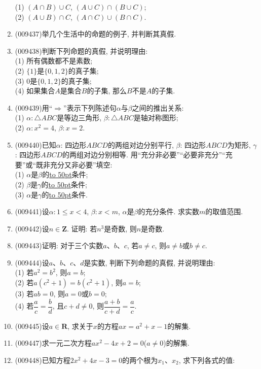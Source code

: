 \documentclass[10pt,a4paper]{article}
\newcommand{\blank}[1]{\underline{\hbox to #1pt{}}}
\begin{document}
\begin{enumerate}[1.]
(1) $(A\cap B)\cup C$, $(A\cup C)\cap (B\cup C)$;\\
(2) $(A\cup B)\cap C$, $(A\cap C)\cup (B\cap C)$.
\item {\tiny (009437)}举几个生活中的命题的例子, 并判断其真假.
\item {\tiny (009438)}判断下列命题的真假, 并说明理由:\\
(1) 所有偶数都不是素数;\\
(2) $\{1\}$是$\{0, 1, 2\}$的真子集;\\
(3) $0$是$\{0, 1, 2\}$的真子集;\\
(4) 如果集合$A$是集合$B$的子集, 那么$B$不是$A$的子集.
\item {\tiny (009439)}用``$\Rightarrow$''表示下列陈述句$\alpha$与$\beta$之间的推出关系:\\
(1) $\alpha: \triangle ABC$是等边三角形, $\beta: \triangle ABC$是轴对称图形;\\
(2) $\alpha: x^2=4$, $\beta: x=2$.
\item {\tiny (009440)}已知$\alpha$: 四边形$ABCD$的两组对边分别平行, $\beta$: 四边形$ABCD$为矩形, $\gamma$: 四边形$ABCD$的两组对边分别相等. 用``充分非必要''``必要非充分''``充要''或``既非充分又非必要''填空:\\
(1) $\alpha$是$\beta$的\blank{50}条件;\\
(2) $\beta$是$\gamma$的\blank{50}条件;\\
(3) $\alpha$是$\gamma$的\blank{50}条件.
\item {\tiny (009441)}设$\alpha: 1\le x<4$, $\beta: x<m$, $\alpha$是$\beta$的充分条件. 求实数$m$的取值范围.
\item {\tiny (009442)}设$n\in \mathbf{Z}$. 证明: 若$n^3$是奇数, 则$n$是奇数.
\item {\tiny (009443)}证明: 对于三个实数$a$、$b$、$c$, 若$a\ne c$, 则$a\ne b$或$b\ne c$.
\item {\tiny (009444)}设$a$、$b$、$c$、$d$是实数, 判断下列命题的真假, 并说明理由:\\
(1) 若$a^2=b^2$, 则$a=b$;\\
(2) 若$a(c^2+1)=b(c^2+1)$, 则$a=b$;\\
(3) 若$ab=0$, 则$a=0$或$b=0$;\\
(4) 若$\dfrac ac=\dfrac bd$, 且$c+d\ne 0$, 则$\dfrac{a+b}{c+d}=\dfrac ac$.
\item {\tiny (009445)}设$a\in \mathbf{R}$, 求关于$x$的方程$ax=a^2+x-1$的解集.
\item {\tiny (009447)}求一元二次方程$ax^2-4x+2=0$($a\ne 0$)的解集.
\item {\tiny (009448)}已知方程$2x^2+4x-3=0$的两个根为$x_1$、$x_2$, 求下列各式的值:\\

\end{enumerate}
\end{document}
